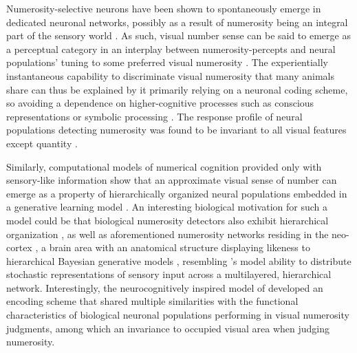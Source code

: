\documentclass[twocolumn]{article}
\begin{document}
Numerosity-selective neurons have been shown to spontaneously emerge in dedicated neuronal networks, possibly as a result of numerosity being an integral part of the sensory world \citep{viswanathan2013neuronal}. As such, visual number sense can be said to emerge as a perceptual category in an interplay between numerosity-percepts and neural populations' tuning to some preferred visual numerosity \citep{nieder2016neuronal}. The experientially instantaneous capability to discriminate visual numerosity that many animals share \citep{nieder2016neuronal, animalsnumericalcognition} can thus be explained by it primarily relying on a neuronal coding scheme, so avoiding a dependence on higher-cognitive processes such as conscious representations \citep[p.~58 points to types of visual number sense being pre-attentive]{dehaene2011number} or symbolic processing \citep[visual numerosity percepts are understood non-verbally,][]{nieder2016neuronal}. The response profile of neural populations detecting numerosity was found to be invariant to all visual features except quantity \citep{nieder2016neuronal, harvey2013topographic}.

Similarly, computational models of numerical cognition provided only with sensory-like information  show that an approximate visual sense of number can emerge as a property of hierarchically organized neural populations embedded in a generative learning model \citep{stoianov2012}. An interesting biological motivation for such a model could be that biological numerosity detectors also exhibit hierarchical organization \citep{nieder2016neuronal, viswanathan2013neuronal}, as well as aforementioned numerosity networks residing in the neo-cortex \citep{nieder2016neuronal}, a brain area with an anatomical structure displaying likeness to hierarchical Bayesian generative models
\citetext{\citealp{friston2003learning}; although the brain in general is sometimes characterized as a probabilistic modeler of it's sensory world, e.g. \citealp{bayesianbrain, griffiths2006optimal}}, resembling \citet{stoianov2012}'s model ability to distribute stochastic representations of sensory input across a multilayered, hierarchical network. Interestingly, the neurocognitively inspired model of \citet{stoianov2012} developed an encoding scheme that shared multiple similarities with the functional characteristics of biological neuronal populations performing in visual numerosity judgments, among which an invariance to occupied visual area when judging numerosity.
\end{document}
